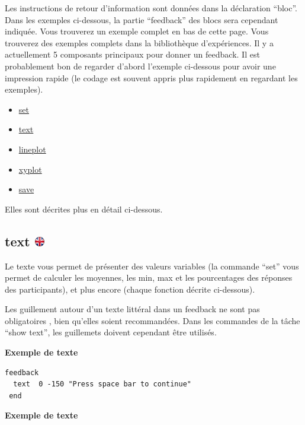\documentclass[
]{book}
\providecommand{\tightlist}{%
  \setlength{\itemsep}{0pt}\setlength{\parskip}{0pt}}
\begin{document}
Les instructions de retour d'information sont données dans la
déclaration ``bloc''. Dans les exemples ci-dessous, la partie
``feedback'' des blocs sera cependant indiquée. Vous trouverez un
exemple complet en bas de cette page. Vous trouverez des exemples
complets dans la bibliothèque d'expériences. Il y a actuellement 5
composants principaux pour donner un feedback. Il est probablement bon
de regarder d'abord l'exemple ci-dessous pour avoir une impression
rapide (le codage est souvent appris plus rapidement en regardant les
exemples).

\begin{itemize}
\tightlist
\item
  \protect\hyperlink{feedbackset}{set}
\item
  \protect\hyperlink{feedbacktext}{text}
\item
  \href{feedbacklineplot}{lineplot}
\item
  \href{feedbacklineplot}{xyplot}
\item
  \href{feedbacksave}{save}
\end{itemize}

Elles sont décrites plus en détail ci-dessous.

\hypertarget{text}{%
\subsection[text ]{\texorpdfstring{text
\href{https://www.psytoolkit.org/doc3.1.0/feedback.html\#_text}{\protect\includegraphics{img/ukflag.png}}}{text }}\label{text}}

Le texte vous permet de présenter des valeurs variables (la commande
``set'' vous permet de calculer les moyennes, les min, max et les
pourcentages des réponses des participants), et plus encore (chaque
fonction décrite ci-dessous).

Les guillement autour d'un texte littéral dans un feedback ne sont pas
obligatoires , bien qu'elles soient recommandées. Dans les commandes de
la tâche ``show text'', les guillemets doivent cependant être utilisés.

\textbf{Exemple de texte}

\begin{verbatim}
feedback
  text  0 -150 "Press space bar to continue"
 end
\end{verbatim}

\textbf{Exemple de texte}
\end{document}
